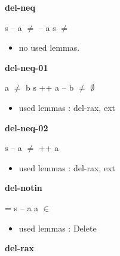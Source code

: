 \documentclass[a4paper]{article}
\begin{document}
\bigskip

{\large\bf del-neq}

\medskip

 \Fol s -- a $\neq$  -- a \Imp s $\neq$ 

\begin{itemize}


\item       no used lemmas.

\end{itemize}

\medskip

\bigskip

{\large\bf del-neq-01}

\medskip

 \Fol a $\neq$ b \Imp s ++ a -- b $\neq$ $\emptyset$

\begin{itemize}


\item       used lemmas  : del-rax, ext

\end{itemize}

\medskip

\bigskip

{\large\bf del-neq-02}

\medskip

 \Fol s -- a $\neq$  ++ a

\begin{itemize}


\item       used lemmas  : del-rax, ext

\end{itemize}

\medskip

\bigskip

{\large\bf del-notin}

\medskip

 \Fol {} = s -- a \Imp \Not a $\in$ 

\begin{itemize}


\item       used lemmas  : Delete

\end{itemize}

\medskip

\bigskip

{\large\bf del-rax}

\medskip
\end{document}
